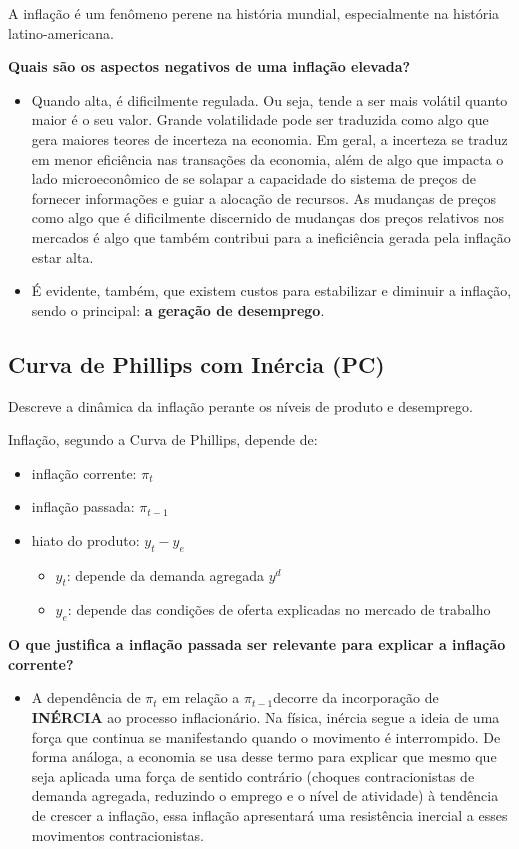 \documentclass[a4paper,12pt]{article}[abntex2]
\begin{document}
A  inflação  é  um  fenômeno  perene  na  história  mundial,  especialmente  na  história  latino-americana. 

\textbf{Quais são os aspectos negativos de uma inflação elevada?}\begin{itemize}
    \item Quando alta, é dificilmente regulada. Ou seja, tende a ser mais volátil quanto maior é o seu valor. Grande volatilidade pode ser traduzida como algo que gera maiores teores de incerteza  na  economia.  Em  geral,  a  incerteza  se  traduz  em  menor  eficiência  nas transações da economia, além de algo que impacta o lado microeconômico de se solapar a capacidade do sistema de preços de fornecer informações e guiar a alocação de  recursos.  As  mudanças  de  preços  como  algo  que  é  dificilmente  discernido  de mudanças dos preços relativos nos mercados é algo que também contribui para a ineficiência gerada pela inflação estar alta.
    \item É evidente, também, que existem custos para estabilizar e diminuir a inflação, sendo o principal: \textbf{a geração de desemprego}. 
\end{itemize}

\subsection{\textbf{Curva de Phillips com Inércia (PC)}}
Descreve  a  dinâmica  da  inflação  perante  os  níveis  de  produto  e desemprego. 

Inflação, segundo a Curva de Phillips, depende de: \begin{itemize}
    \item inflação corrente: \(\pi_t\)
    \item inflação passada: \(\pi_{t-1}\)
    \item hiato do produto: \(y_t-y_e\)\begin{itemize}
        \item \(y_t\): depende da demanda agregada \(y^d\)
        \item \(y_e\): depende das condições de oferta explicadas no mercado de trabalho
    \end{itemize}
\end{itemize}

\textbf{ O que justifica a inflação passada ser relevante para explicar a inflação corrente?}\begin{itemize}
    \item A dependência de \(\pi_t\) em relação a \(\pi_{t-1}\)decorre da incorporação de \textbf{INÉRCIA} ao processo inflacionário. Na física, inércia segue a ideia de uma força que continua se manifestando quando o movimento é interrompido. De forma análoga, a economia se usa desse termo para explicar que mesmo que seja aplicada uma força de sentido contrário (choques contracionistas de demanda agregada, reduzindo o emprego e o nível de atividade) à tendência de crescer a inflação, essa inflação apresentará uma resistência inercial a esses movimentos contracionistas. 
\end{itemize}
\end{document}
